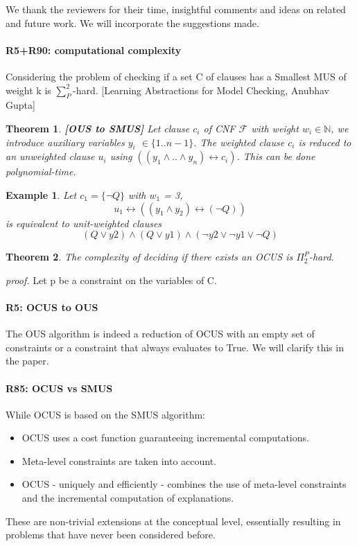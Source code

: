\documentclass{article}
\newtheorem{theorem}{Theorem}
\newtheorem{example}{Example}
\begin{document}
We thank the reviewers for their time, insightful comments and ideas on related and future work. We will incorporate the suggestions made.

\paragraph{R5+R90: computational complexity}

Considering the problem of checking if a set C of clauses has a Smallest MUS of weight k is $\sum_{P}^{2}$-hard. [Learning Abstractions for Model Checking, Anubhav Gupta]

\begin{theorem}
	\textbf{[OUS to SMUS]}
	Let clause $c_i$ of CNF $\mathcal{F}$ with weight $w_i \in \mathbb{N}$, we introduce auxiliary variables $y_i$  $\in \{1..n-1\}$. The weighted clause $c_i$ is reduced to an unweighted clause $u_i$ using $((y_1 \wedge .. \wedge y_n) \leftrightarrow c_i )$. This can be done polynomial-time.
\end{theorem}
\begin{example}
	Let $c_1 = \{ \lnot Q\}$ with $w_1$ = 3, \[u_1 \leftrightarrow ((y_1 \wedge y_2) \leftrightarrow (\lnot Q))\]  is equivalent to unit-weighted clauses \[(Q \vee y2) \wedge (Q \vee y1) \wedge (\lnot y2 \vee \lnot y1 \vee \lnot Q) \]
\end{example}


\begin{theorem}
	The complexity of deciding if there exists an OCUS is ${\Pi}^P_2$-hard. 
\end{theorem}

\textit{proof.} Let p be a constraint on the variables of C.

\paragraph{R5: OCUS to OUS} The OUS algorithm is indeed a reduction of OCUS with an empty set of constraints or a constraint that always evaluates to True. We will clarify this in the paper.

\paragraph{R85: OCUS vs SMUS} While OCUS is based on the SMUS algorithm: 
\begin{itemize}
	\item OCUS uses a cost function guaranteeing incremental computations.
	\item Meta-level constraints are taken into account.
	\item OCUS - uniquely and efficiently - combines the use of meta-level constraints and the incremental computation of explanations. 
\end{itemize}
These are non-trivial extensions at the conceptual level, essentially resulting in problems that have never been considered before. 
\end{document}
